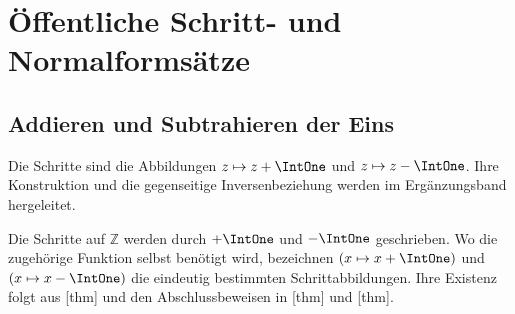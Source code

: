 \documentclass[main.tex]{subfiles}
\begin{document}
\chapter{Öffentliche Schritt- und Normalformsätze}

\section{Addieren und Subtrahieren der Eins}

Die Schritte sind die Abbildungen \(z\mapsto z+\IntOne\) und
\(z\mapsto z-\IntOne\). Ihre Konstruktion und die gegenseitige
Inversenbeziehung werden im Ergänzungsband hergeleitet.

Die Schritte auf \(\mathbb Z\) werden durch \(+\IntOne\) und
\(-\IntOne\) geschrieben. Wo die zugehörige Funktion selbst benötigt wird,
bezeichnen \((x\mapsto x+\IntOne)\) und \((x\mapsto x-\IntOne)\)
die eindeutig bestimmten Schrittabbildungen.
Ihre Existenz folgt aus [thm]
und den Abschlussbeweisen in
[thm] und
[thm].















\end{document}
